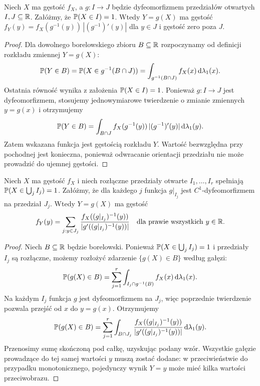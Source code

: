 \begin{stwierdzenie}
Niech $X$ ma gęstość $f_X$, a $g:I\to J$ będzie dyfeomorfizmem
przedziałów otwartych $I,J\subseteq\mathbb{R}$. Załóżmy, że
$\mathbb{P}(X\in I)=1$. Wtedy $Y=g(X)$ ma gęstość
$f_Y(y)=f_X(g^{-1}(y))\,|(g^{-1})'(y)|$ dla $y\in J$
i gęstość zero poza $J$.
\end{stwierdzenie}
\begin{proof}
Dla dowolnego borelowskiego zbioru $B\subseteq\mathbb{R}$
rozpoczynamy od definicji rozkładu zmiennej $Y=g(X)$:
\[
\mathbb{P}(Y\in B)=\mathbb{P}(X\in g^{-1}(B\cap J))
=\int_{g^{-1}(B\cap J)}f_X(x)\,\mathrm{d}\lambda_1(x).
\]
Ostatnia równość wynika z założenia $\mathbb{P}(X\in I)=1$.
Ponieważ $g:I\to J$ jest dyfeomorfizmem, stosujemy
jednowymiarowe twierdzenie o zmianie zmiennych
$y=g(x)$ i otrzymujemy
\[
\mathbb{P}(Y\in B)=\int_{B\cap J}
 f_X(g^{-1}(y))\,|(g^{-1})'(y)|\,\mathrm{d}\lambda_1(y).
\]
Zatem wskazana funkcja jest gęstością rozkładu $Y$.
Wartość bezwzględna przy pochodnej jest konieczna,
ponieważ odwracanie orientacji przedziału nie może
prowadzić do ujemnej gęstości.
\end{proof}

\begin{stwierdzenie}
Niech $X$ ma gęstość $f_X$ i niech rozłączne przedziały otwarte
$I_1,\ldots,I_r$ spełniają $\mathbb{P}(X\in\bigcup_jI_j)=1$.
Załóżmy, że dla każdego $j$ funkcja $g|_{I_j}$ jest
$C^1$-dyfeomorfizmem na przedział $J_j$.
Wtedy $Y=g(X)$ ma gęstość
\[
f_Y(y)=\sum_{j:y\in J_j}
\frac{f_X((g|_{I_j})^{-1}(y))}
{|g'((g|_{I_j})^{-1}(y))|}
\quad\text{dla prawie wszystkich }y\in\mathbb{R}.
\]
\end{stwierdzenie}
\begin{proof}
Niech $B\subseteq\mathbb{R}$ będzie borelowski. Ponieważ
$\mathbb{P}(X\in\bigcup_j I_j)=1$ i przedziały $I_j$
są rozłączne, możemy rozłożyć zdarzenie $\{g(X)\in B\}$
według gałęzi:
\[
\mathbb{P}(g(X)\in B)=\sum_{j=1}^r
\int_{I_j\cap g^{-1}(B)} f_X(x)\,\mathrm{d}\lambda_1(x).
\]
Na każdym $I_j$ funkcja $g$ jest dyfeomorfizmem
na $J_j$, więc poprzednie twierdzenie pozwala
przejść od $x$ do $y=g(x)$. Otrzymujemy
\[
\mathbb{P}(g(X)\in B)=\sum_{j=1}^r
\int_{B\cap J_j}
\frac{f_X((g|_{I_j})^{-1}(y))}
{|g'((g|_{I_j})^{-1}(y))|}\,\mathrm{d}\lambda_1(y).
\]
Przenosimy sumę skończoną pod całkę, uzyskując
podany wzór. Wszystkie gałęzie prowadzące do tej samej
wartości $y$ muszą zostać dodane: w przeciwieństwie
do przypadku monotonicznego, pojedynczy wynik $Y=y$
może mieć kilka wartości przeciwobrazu.
\end{proof}

